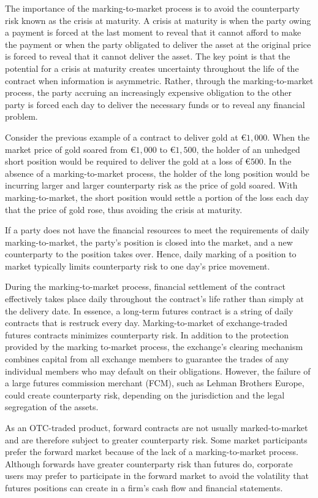 \documentclass[11pt]{article}
\begin{document}
The importance of the marking-to-market process is to avoid the counterparty risk known as the crisis at maturity. A crisis at maturity is when the party owing a payment is forced at the last moment to reveal that it cannot afford to make the payment or when the party obligated to deliver the asset at the original price is forced to reveal that it cannot deliver the asset. The key point is that the potential for a crisis at maturity creates uncertainty throughout the life of the contract when information is asymmetric. Rather, through the marking-to-market process, the party accruing an increasingly expensive obligation to the other party is forced each day to deliver the necessary funds or to reveal any financial problem.

Consider the previous example of a contract to deliver gold at $€ 1,000$. When the market price of gold soared from $€ 1,000$ to $€ 1,500$, the holder of an unhedged short position would be required to deliver the gold at a loss of $€ 500$. In the absence of a marking-to-market process, the holder of the long position would be incurring larger and larger counterparty risk as the price of gold soared. With marking-to-market, the short position would settle a portion of the loss each day that the price of gold rose, thus avoiding the crisis at maturity.

If a party does not have the financial resources to meet the requirements of daily marking-to-market, the party's position is closed into the market, and a new counterparty to the position takes over. Hence, daily marking of a position to market typically limits counterparty risk to one day's price movement.

During the marking-to-market process, financial settlement of the contract effectively takes place daily throughout the contract's life rather than simply at the delivery date. In essence, a long-term futures contract is a string of daily contracts that is restruck every day. Marking-to-market of exchange-traded futures contracts minimizes counterparty risk. In addition to the protection provided by the marking to-market process, the exchange's clearing mechanism combines capital from all exchange members to guarantee the trades of any individual members who may default on their obligations. However, the failure of a large futures commission merchant (FCM), such as Lehman Brothers Europe, could create counterparty risk, depending on the jurisdiction and the legal segregation of the assets.

As an OTC-traded product, forward contracts are not usually marked-to-market and are therefore subject to greater counterparty risk. Some market participants prefer the forward market because of the lack of a marking-to-market process. Although forwards have greater counterparty risk than futures do, corporate users may prefer to participate in the forward market to avoid the volatility that futures positions can create in a firm's cash flow and financial statements.
\end{document}
